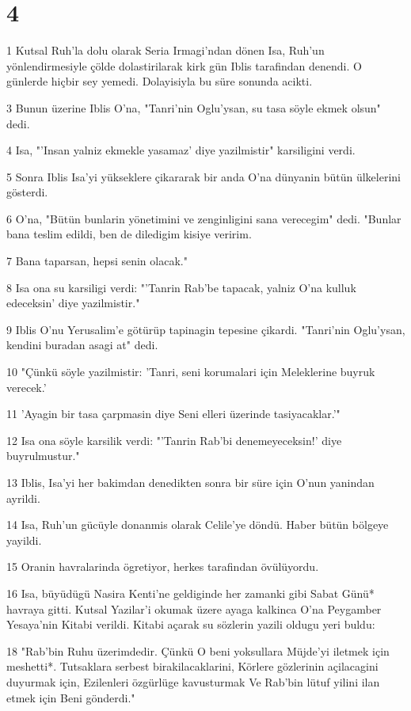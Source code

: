 \chapter{4}

\par 1 Kutsal Ruh'la dolu olarak Seria Irmagi'ndan dönen Isa, Ruh'un yönlendirmesiyle çölde dolastirilarak kirk gün Iblis tarafindan denendi. O günlerde hiçbir sey yemedi. Dolayisiyla bu süre sonunda acikti.
\par 3 Bunun üzerine Iblis O'na, "Tanri'nin Oglu'ysan, su tasa söyle ekmek olsun" dedi.
\par 4 Isa, "'Insan yalniz ekmekle yasamaz' diye yazilmistir" karsiligini verdi.
\par 5 Sonra Iblis Isa'yi yükseklere çikararak bir anda O'na dünyanin bütün ülkelerini gösterdi.
\par 6 O'na, "Bütün bunlarin yönetimini ve zenginligini sana verecegim" dedi. "Bunlar bana teslim edildi, ben de diledigim kisiye veririm.
\par 7 Bana taparsan, hepsi senin olacak."
\par 8 Isa ona su karsiligi verdi: "'Tanrin Rab'be tapacak, yalniz O'na kulluk edeceksin' diye yazilmistir."
\par 9 Iblis O'nu Yerusalim'e götürüp tapinagin tepesine çikardi. "Tanri'nin Oglu'ysan, kendini buradan asagi at" dedi.
\par 10 "Çünkü söyle yazilmistir: 'Tanri, seni korumalari için Meleklerine buyruk verecek.'
\par 11 'Ayagin bir tasa çarpmasin diye Seni elleri üzerinde tasiyacaklar.'"
\par 12 Isa ona söyle karsilik verdi: "'Tanrin Rab'bi denemeyeceksin!' diye buyrulmustur."
\par 13 Iblis, Isa'yi her bakimdan denedikten sonra bir süre için O'nun yanindan ayrildi.
\par 14 Isa, Ruh'un gücüyle donanmis olarak Celile'ye döndü. Haber bütün bölgeye yayildi.
\par 15 Oranin havralarinda ögretiyor, herkes tarafindan övülüyordu.
\par 16 Isa, büyüdügü Nasira Kenti'ne geldiginde her zamanki gibi Sabat Günü* havraya gitti. Kutsal Yazilar'i okumak üzere ayaga kalkinca O'na Peygamber Yesaya'nin Kitabi verildi. Kitabi açarak su sözlerin yazili oldugu yeri buldu:
\par 18 "Rab'bin Ruhu üzerimdedir. Çünkü O beni yoksullara Müjde'yi iletmek için meshetti*. Tutsaklara serbest birakilacaklarini, Körlere gözlerinin açilacagini duyurmak için, Ezilenleri özgürlüge kavusturmak Ve Rab'bin lütuf yilini ilan etmek için Beni gönderdi."
